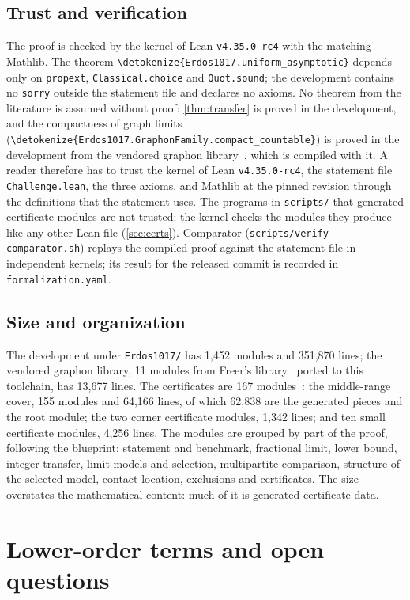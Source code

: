 \documentclass[10pt]{article}
\theoremstyle{definition}
\theoremstyle{remark}
\numberwithin{equation}{section}
\newcommand{\lean}[1]{\texttt{#1}}
\newcommand{\leanid}[1]{\expandafter\nolinkurl\expandafter{\detokenize{#1}}}
\newcommand{\Fm}[1]{\cite[#1]{Formalization}}
\begin{document}
\subsection{Trust and verification}
The proof is checked by the kernel of Lean \texttt{v4.35.0-rc4} with the matching Mathlib. The theorem \leanid{Erdos1017.uniform_asymptotic} depends only on \lean{propext}, \lean{Classical.choice} and \lean{Quot.sound}; the development contains no \lean{sorry} outside the statement file and declares no axioms. No theorem from the literature is assumed without proof: \cref{thm:transfer} is proved in the development, and the compactness of graph limits (\leanid{Erdos1017.GraphonFamily.compact_countable}) is proved in the development from the vendored graphon library~\cite{Freer}, which is compiled with it. A reader therefore has to trust the kernel of Lean \texttt{v4.35.0-rc4}, the statement file \lean{Challenge.lean}, the three axioms, and Mathlib at the pinned revision through the definitions that the statement uses. The programs in \lean{scripts/} that generated certificate modules are not trusted: the kernel checks the modules they produce like any other Lean file (\cref{sec:certs}). Comparator (\lean{scripts/verify-comparator.sh}) replays the compiled proof against the statement file in independent kernels; its result for the released commit is recorded in \lean{formalization.yaml}.

\subsection{Size and organization}
The development under \lean{Erdos1017/} has 1,452 modules and 351,870 lines; the vendored graphon library, 11 modules from Freer's library~\cite{Freer} ported to this toolchain, has 13,677 lines. The certificates are 167 modules~\Fm{\S11.1}: the middle-range cover, 155 modules and 64,166 lines, of which 62,838 are the generated pieces and the root module; the two corner certificate modules, 1,342 lines; and ten small certificate modules, 4,256 lines. The modules are grouped by part of the proof, following the blueprint: statement and benchmark, fractional limit, lower bound, integer transfer, limit models and selection, multipartite comparison, structure of the selected model, contact location, exclusions and certificates. The size overstates the mathematical content: much of it is generated certificate data.

\section{Lower-order terms and open questions}\label{sec:discussion}
\end{document}

